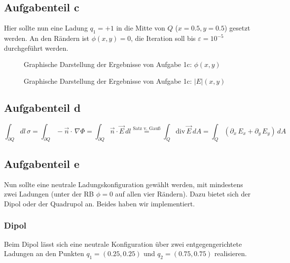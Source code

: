 \subsection*{Aufgabenteil c}
Hier sollte nun eine Ladung $q_1 = +1$ in die Mitte von $Q$ ($x=0.5, y=0.5$) gesetzt werden. An den Rändern ist $\phi(x,y) = 0$, die Iteration soll bis $\varepsilon = 10^{-5}$ durchgeführt werden.

\begin{landscape}
	\begin{figure}
		\caption{Graphische Darstellung der Ergebnisse von Aufgabe 1c: $\phi(x,y)$}
		\label{fig:cPhi}
	\end{figure}
\end{landscape} 

\begin{landscape}
	\begin{figure}
		\caption{Graphische Darstellung der Ergebnisse von Aufgabe 1c: $|E|(x,y)$}
		\label{fig:cabsE}
	\end{figure}
\end{landscape} 

\subsection*{Aufgabenteil d}
\begin{equation*}
\int_{\partial Q} dl\,\sigma = \int_{\partial Q} -\vec{n}\cdot \,\nabla \Phi = \int_{\partial Q} \vec{n}\cdot \vec{E}\,dl \stackrel{\text{Satz v. Gauß}}{=} \int_{Q} \text{div}\,\vec{E}\, dA = \int_{Q} \left(\partial_x \,E_x+\partial_y\,E_y\right)\, dA
\end{equation*}

\subsection*{Aufgabenteil e}
Nun sollte eine neutrale Ladungskonfiguration gewählt werden, mit mindestens zwei Ladungen (unter der RB $\phi = 0$ auf allen vier Rändern). Dazu bietet sich der Dipol oder der Quadrupol an. Beides haben wir implementiert.

\subsubsection*{Dipol}
Beim Dipol lässt sich eine neutrale Konfiguration über zwei entgegengerichtete Ladungen an den Punkten $q_1 = (0.25, 0.25)$ und $q_2 = (0.75,0.75)$ realisieren.


